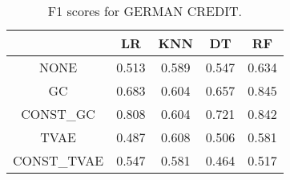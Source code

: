 \begin{table}
\caption{F1 scores for GERMAN CREDIT.}
\label{tab:f1-GERMAN CREDIT}
\begin{tabular}{ccccc}
\toprule
 & LR & KNN & DT & RF \\
\midrule
NONE & 0.513 & 0.589 & 0.547 & 0.634 \\
GC & 0.683 & 0.604 & 0.657 & 0.845 \\
CONST\_GC & 0.808 & 0.604 & 0.721 & 0.842 \\
TVAE & 0.487 & 0.608 & 0.506 & 0.581 \\
CONST\_TVAE & 0.547 & 0.581 & 0.464 & 0.517 \\
\bottomrule
\end{tabular}
\end{table}
